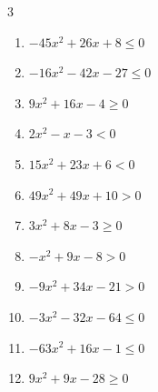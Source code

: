 \begin{multicols}{3}
\begin{enumerate}
  \item $-45x^{2}+26x+8\leq 0$


  \item $-16x^{2}-42x-27\leq 0$


\columnbreak %

  \item $9x^{2}+16x-4\geq 0$


  \item $2x^{2}-x-3<0$


  \item $15x^{2}+23x+6<0$


  \item $49x^{2}+49x+10>0$


  \item $3x^{2}+8x-3\geq 0$


  \item $-x^{2}+9x-8>0$

        \phantom{$\displaystyle 1 < x < 8$}

  \item $-9x^{2}+34x-21>0$


  \item $-3x^{2}-32x-64\leq 0$


  \item $-63x^{2}+16x-1\leq 0$


  \item $9x^{2}+9x-28\geq 0$



\end{enumerate}
\end{multicols}
